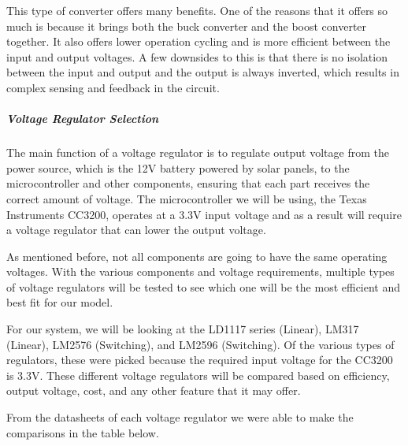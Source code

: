 This type of converter offers many benefits. One of the reasons that it offers so much is because it brings both the buck converter and the boost converter together. It also offers lower operation cycling and is more efficient between the input and output voltages. A few downsides to this is that there is no isolation between the input and output and the output is always inverted, which results in complex sensing and feedback in the circuit. \par
\subparagraph{Voltage Regulator Selection}
The main function of a voltage regulator is to regulate output voltage from the power source, which is the 12V battery powered by solar panels, to the microcontroller and other components, ensuring that each part receives the correct amount of voltage. The microcontroller we will be using, the Texas Instruments CC3200, operates at a 3.3V input voltage and as a result will require a voltage regulator that can lower the output voltage. \par
As mentioned before, not all components are going to have the same operating voltages. With the various components and voltage requirements, multiple types of voltage regulators will be tested to see which one will be the most efficient and best fit for our model.\par
For our system, we will be looking at the LD1117 series (Linear), LM317 (Linear), LM2576 (Switching), and LM2596 (Switching). Of the various types of regulators, these were picked because the required input voltage for the CC3200 is 3.3V. These different voltage regulators will be compared based on efficiency, output voltage, cost, and any other feature that it may offer. \par
From the datasheets of each voltage regulator we were able to make the comparisons in the table below.\par
